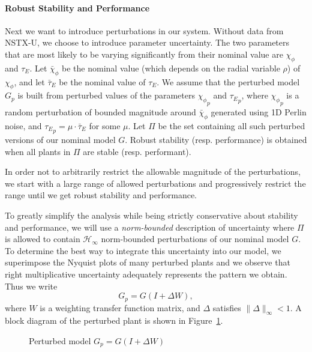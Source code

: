 \documentclass[12pt,lot, lof]{puthesis}
\begin{document}
\paragraph{Robust Stability and Performance}

Next we want to introduce perturbations in our system.
Without data from NSTX-U, we choose to introduce parameter uncertainty.
The two parameters that are most likely to be varying significantly from their nominal value are $\chi_\phi$ and $\tau_E$.
Let $\bar{\chi}_\phi$ be the nominal value (which depends on the radial variable $\rho$) of $\chi_\phi$, and
let $\bar{\tau}_E$ be the nominal value of $\tau_E$.
We assume that the perturbed model $G_p$ is built from perturbed values of the parameters ${\chi_\phi}_p$ and ${\tau_E}_p$, where
${\chi_\phi}_p$ is a random perturbation of bounded magnitude around $\bar{\chi}_\phi$ generated using 1D Perlin noise, and ${\tau_E}_p = \mu \cdot \bar{\tau}_E$ for some $\mu$.
Let $\Pi$ be the set containing all such perturbed versions of our nominal model $G$.
Robust stability (resp. performance) is obtained when all plants in $\Pi$ are stable (resp. performant).

In order not to arbitrarily restrict the allowable magnitude of the perturbations, we start with a large range of allowed perturbations and progressively restrict the range until we get robust stability and performance.

To greatly simplify the analysis while being strictly conservative about stability and performance, we will use a \emph{norm-bounded} description of uncertainty where $\Pi$ is allowed to contain $\mathcal{H}_\infty$ norm-bounded perturbations of our nominal model $G$.
To determine the best way to integrate this uncertainty into our model, we superimpose the Nyquist plots of many perturbed plants and we observe that right multiplicative uncertainty adequately represents the pattern we obtain.
Thus we write
\begin{equation} \label{eq:multiplicative}
	G_p = G (I + \Delta W),
\end{equation}
where $W$ is a weighting transfer function matrix, and $\Delta$ satisfies $\|\Delta\|_\infty < 1$.
A block diagram of the perturbed plant is shown in Figure~\ref{fig:multiplicative}.

\begin{figure}[htbp]
	\centering
	\caption{Perturbed model $G_p = G (I + \Delta W)$}
	\label{fig:multiplicative}
\end{figure}
\end{document}
